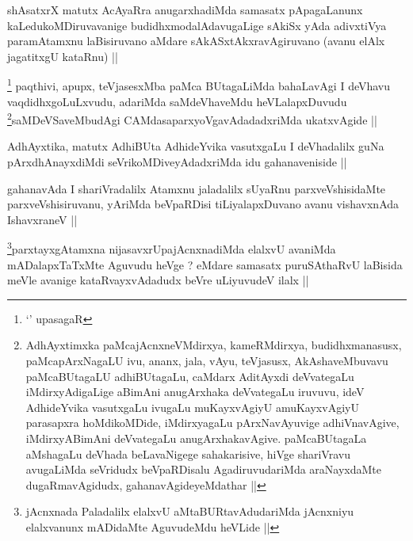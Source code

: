 
\begin{artha}
shAsatxrX matutx AcAyaRra anugarxhadiMda samasatx pApagaLanunx
kaLedukoMDiruvavanige budidhxmodalAdavugaLige sAkiSx yAda adivxtiVya
paramAtamxnu laBisiruvano aMdare sAkASxtAkxravAgiruvano (avanu elAlx
jagatitxgU kataRnu) ||
\end{artha} 


\begin{artha}
\footnote{`\stext' upasagaR} paqthivi, apupx, teVjasesxMba paMca BUtagaLiMda bahaLavAgi
I deVhavu vaqdidhxgoLuLxvudu, adariMda saMdeVhaveMdu
heVLalapxDuvudu \footnote{AdhAyxtimxka paMcajAcnxneVMdirxya,
  kameRMdirxya, budidhxmanasusx, paMcapArxNagaLU ivu, ananx, jala,
  vAyu, teVjasusx, AkAshaveMbuvavu paMcaBUtagaLU adhiBUtagaLu, caMdarx
  AditAyxdi deVvategaLu iMdirxyAdigaLige aBimAni anugArxhaka
  deVvategaLu iruvuvu, ideV AdhideYvika vasutxgaLu ivugaLu
  muKayxvAgiyU amuKayxvAgiyU parasapxra hoMdikoMDide, iMdirxyagaLu
  pArxNavAyuvige adhiVnavAgive, iMdirxyABimAni deVvategaLu
  anugArxhakavAgive. paMcaBUtagaLa aMshagaLu deVhada beLavaNigege
  sahakarisive, hiVge shariVravu avugaLiMda seVridudx beVpaRDisalu
  AgadiruvudariMda araNayxdaMte dugaRmavAgidudx, gahanavAgideyeMdathar ||}saMDeVSaveMbudAgi
CAMdasaparxyoVgavAdadadxriMda ukatxvAgide ||
\end{artha}


\begin{artha}
AdhAyxtika, matutx AdhiBUta AdhideYvika vasutxgaLu I deVhadalilx guNa
pArxdhAnayxdiMdi seVrikoMDiveyAdadxriMda idu gahanaveniside ||
\end{artha}


\begin{artha}
gahanavAda I shariVradalilx Atamxnu jaladalilx sUyaRnu
parxveVshisidaMte parxveVshisiruvanu, yAriMda beVpaRDisi
tiLiyalapxDuvano avanu vishavxnAda IshavxraneV ||
\end{artha}


\begin{artha}
\footnote{jAcnxnada Paladalilx elalxvU aMtaBURtavAdudariMda jAcnxniyu
  elalxvanunx mADidaMte AguvudeMdu heVLide ||}parxtayxgAtamxna nijasavxrUpajAcnxnadiMda elalxvU avaniMda
mADalapxTaTxMte Aguvudu heVge ? eMdare samasatx puruSAthaRvU laBisida
meVle avanige kataRvayxvAdadudx beVre uLiyuvudeV ilalx ||
\end{artha}

